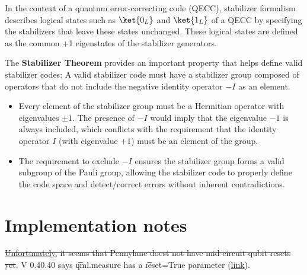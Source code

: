 \vsp

In the context of a quantum error-correcting code (QECC), stabilizer formalism describes logical
states such as \(\ket{0_L}\) and \(\ket{1_L}\) of a QECC by specifying the stabilizers that leave
these states unchanged.  These logical states are defined as the common +1 eigenstates of the
stabilizer generators.

\vsp

The \textbf{Stabilizer Theorem} provides an important property that helps define valid stabilizer
codes: A valid stabilizer code must have a stabilizer group composed of operators that do not
include the negative identity operator \(-I\) as an element.

\begin{itemize}
  \item Every element of the stabilizer group must be a Hermitian operator with eigenvalues \( \pm 1
\). The presence of \(-I\) would imply that the eigenvalue \(-1\) is always included, which
conflicts with the requirement that the identity operator \(I\) (with eigenvalue \(+1\)) must be an
element of the group.
  \item The requirement to exclude \(-I\) ensures the stabilizer group forms a valid subgroup of the
Pauli group, allowing the stabilizer code to properly define the code space and detect/correct
errors without inherent contradictions.
\end{itemize}


\section{Implementation notes}

\ls \st{\href{https://discuss.pennylane.ai/t/how-to-reset-a-specific-qubit-to-0-during-computation/1871/17}{Unfortunately},
    it seems that Pennylane doest not have mid-circuit qubit resets yet}.  V 0.40.40 says
    \t{qml.measure} has a \t{reset=True} parameter
    (\href{https://docs.pennylane.ai/en/stable/introduction/dynamic_quantum_circuits.html#conditional-operators}{link}).
\le

% 

